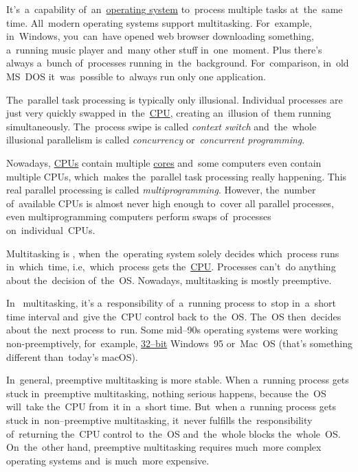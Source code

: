 \label{multitasking}
It's~a~capability of~an~\hyperref[os]{operating system} to~process multiple tasks at~the~same time.
All~modern operating systems support multitasking.
For~example, in~Windows, you~can~have opened web browser downloading something, a~running music player and~many other stuff in~one~moment.
Plus there's always a~bunch of~processes running in~the~background.
For~comparison, in~old \mbox{MS DOS} it~was~possible to~always run only one application.

The~parallel task processing is typically only illusional.
Individual processes are just very quickly swapped in~the~\hyperref[processorcpucore]{CPU}, creating an~illusion of~them running simultaneously.
The~process swipe is called \textit{context switch} and~the~whole illusional parallelism is called \textit{concurrency} or~\textit{concurrent programming}.

Nowadays, \hyperref[processorcpucore]{CPUs} contain multiple \hyperref[processorcpucore]{cores} and~some computers even contain multiple CPUs, which~makes the~parallel task processing really happening.
This real parallel processing is called \textit{multiprogramming}.
However, the~number of~available CPUs is almost never high enough to~cover all parallel processes, even multiprogramming computers perform swaps of~processes on~individual~CPUs.
\newline

\label{preemption}
Multitasking is , when~the~operating system solely decides which~process runs in~which~time, i.e,~which~process gets the~\hyperref[processorcpucore]{CPU}.
Processes can't~do anything about the~decision of~the~OS\@.
Nowadays, multitasking is mostly preemptive.

In~ multitasking, it's a~responsibility of~a~running process to~stop in~a~short time interval and~give the~CPU control back to~the~OS\@.
The~OS then~decides about the~next process to~run.
Some mid--90s operating systems were working non-preemptively, for~example, \hyperref[32bvs64b]{32--bit} Windows~95 \mbox{or Mac OS} (that's something different \mbox{than today's} macOS).

In~general, preemptive multitasking is more stable.
When a~running process gets stuck in~preemptive multitasking, nothing serious happens, because the~OS will~take the~CPU from~it in~a~short time.
But~when a~running process gets stuck in~non--preemptive multitasking, it~never fulfills the~responsibility of~returning the~CPU control to~the~OS and~the~whole blocks the~whole~OS\@.
On~the~other hand, preemptive multitasking requires much~more complex operating systems and~is much~more expensive.
\newline

